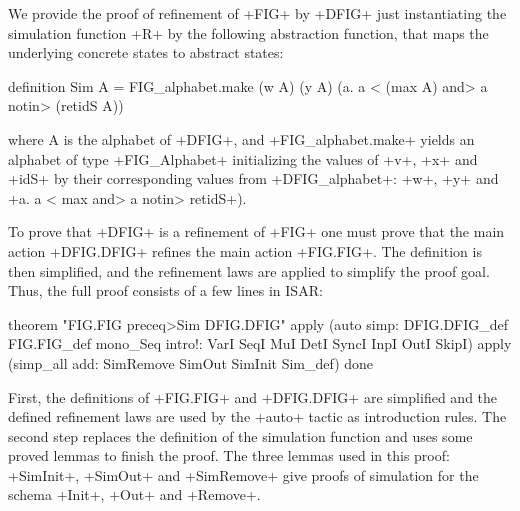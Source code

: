 \documentclass[11pt,a4paper]{article}
\begin{document}
We provide 
the proof of refinement of \inlineisar+FIG+ by \inlineisar+DFIG+  just instantiating the simulation function \inlineisar+R+ by the following abstraction function, that 
maps the underlying concrete states to abstract states:

\begin{isar}
definition Sim A = FIG_alphabet.make (w A) (y A) 
                                  ({a. a < (max A) \<and>   a \<notin> (retidS A)})
\end{isar}
where A is the alphabet of \inlineisar+DFIG+, and \inlineisar+FIG_alphabet.make+ yields an alphabet of type \inlineisar+FIG_Alphabet+ initializing the values of \inlineisar+v+, \inlineisar+x+ and \inlineisar+idS+ by their corresponding values from \inlineisar+DFIG_alphabet+: \inlineisar+w+, \inlineisar+y+ and \inlineisar+{a. a < max \<and>   a \<notin> retidS}+).

To prove that \inlineisar+DFIG+ is a refinement of \inlineisar+FIG+ one must prove that the main action \inlineisar+DFIG.DFIG+ refines the main action \inlineisar+FIG.FIG+. The definition is then simplified, and the refinement laws are applied to simplify the proof goal. Thus, the full proof consists of a few lines in ISAR:

\begin{isar}
theorem "FIG.FIG \<preceq>Sim DFIG.DFIG"
  apply (auto simp: DFIG.DFIG_def FIG.FIG_def mono_Seq
              intro!: VarI SeqI MuI DetI SyncI InpI OutI SkipI)
  apply (simp_all add: SimRemove SimOut SimInit Sim_def)
done
\end{isar}

First, the definitions of \inlineisar+FIG.FIG+ and \inlineisar+DFIG.DFIG+ are simplified and the defined refinement laws are used by the \inlineisar+auto+ tactic as introduction rules. The second step replaces the definition of the simulation function and uses some proved lemmas to finish the proof. The three lemmas used in this proof: \inlineisar+SimInit+, \inlineisar+SimOut+ and \inlineisar+SimRemove+ give proofs of simulation for the schema \inlineisar+Init+, \inlineisar+Out+ and \inlineisar+Remove+.
\end{document}
